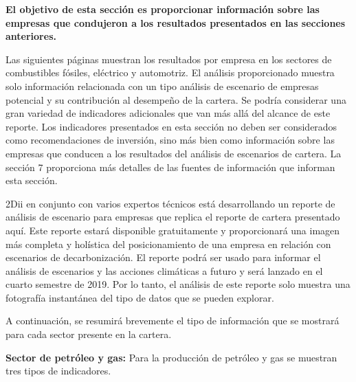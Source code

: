 \documentclass[10pt,table]{article}\usepackage[]{graphicx}\usepackage[]{color}
\begin{document}
	\begin{multicols}{2}
		
		\textbf{El objetivo de esta sección es proporcionar información sobre las empresas que condujeron a los resultados presentados en las secciones anteriores.}
		
	Las siguientes páginas muestran los resultados por empresa en los sectores de combustibles fósiles, eléctrico y automotriz. El análisis proporcionado muestra solo información relacionada con un tipo análisis de escenario de empresas potencial y su contribución al desempeño de la cartera. Se podría considerar una gran variedad de indicadores adicionales que van más allá del alcance de este reporte. Los indicadores presentados en esta sección no deben ser considerados como recomendaciones de inversión, sino más bien como información sobre las empresas que conducen a los resultados del análisis de escenarios de cartera. La sección 7 proporciona más detalles de las fuentes de información que informan esta sección.
		
		2Dii en conjunto con varios expertos técnicos está desarrollando un reporte de análisis de escenario para empresas que replica el reporte de cartera presentado aquí. Este reporte estará disponible gratuitamente y proporcionará una imagen más completa y holística del posicionamiento de una empresa en relación con escenarios de decarbonización. El reporte podrá ser usado para informar el análisis de escenarios y las acciones climáticas a futuro y será lanzado en el cuarto semestre de 2019. Por lo tanto, el análisis de este reporte solo muestra una fotografía instantánea del tipo de datos que se pueden explorar.
		
	A continuación, se resumirá brevemente el tipo de información que se mostrará para cada sector presente en la cartera. 
		
		\textbf{Sector de petróleo y gas: }Para la producción de petróleo y gas se muestran tres tipos de indicadores.
		

\end{multicols}
\end{document}

